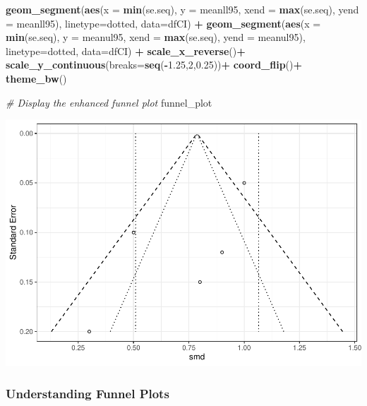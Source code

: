 \documentclass[
]{book}
\newenvironment{Shaded}{\begin{snugshade}}{\end{snugshade}}
\newcommand{\AttributeTok}[1]{\textcolor[rgb]{0.13,0.29,0.53}{#1}}
\newcommand{\CommentTok}[1]{\textcolor[rgb]{0.56,0.35,0.01}{\textit{#1}}}
\newcommand{\DecValTok}[1]{\textcolor[rgb]{0.00,0.00,0.81}{#1}}
\newcommand{\FloatTok}[1]{\textcolor[rgb]{0.00,0.00,0.81}{#1}}
\newcommand{\FunctionTok}[1]{\textcolor[rgb]{0.13,0.29,0.53}{\textbf{#1}}}
\newcommand{\NormalTok}[1]{#1}
\newcommand{\SpecialCharTok}[1]{\textcolor[rgb]{0.81,0.36,0.00}{\textbf{#1}}}
\newcommand{\StringTok}[1]{\textcolor[rgb]{0.31,0.60,0.02}{#1}}
\begin{document}
\begin{Shaded}
\begin{Highlighting}[]
  \FunctionTok{geom\_segment}\NormalTok{(}\FunctionTok{aes}\NormalTok{(}\AttributeTok{x =} \FunctionTok{min}\NormalTok{(se.seq), }\AttributeTok{y =}\NormalTok{ meanll95, }\AttributeTok{xend =} \FunctionTok{max}\NormalTok{(se.seq), }\AttributeTok{yend =}\NormalTok{ meanll95), }\AttributeTok{linetype=}\StringTok{\textquotesingle{}dotted\textquotesingle{}}\NormalTok{, }\AttributeTok{data=}\NormalTok{dfCI) }\SpecialCharTok{+}
  \FunctionTok{geom\_segment}\NormalTok{(}\FunctionTok{aes}\NormalTok{(}\AttributeTok{x =} \FunctionTok{min}\NormalTok{(se.seq), }\AttributeTok{y =}\NormalTok{ meanul95, }\AttributeTok{xend =} \FunctionTok{max}\NormalTok{(se.seq), }\AttributeTok{yend =}\NormalTok{ meanul95), }\AttributeTok{linetype=}\StringTok{\textquotesingle{}dotted\textquotesingle{}}\NormalTok{, }\AttributeTok{data=}\NormalTok{dfCI) }\SpecialCharTok{+}
  \FunctionTok{scale\_x\_reverse}\NormalTok{()}\SpecialCharTok{+}
  \FunctionTok{scale\_y\_continuous}\NormalTok{(}\AttributeTok{breaks=}\FunctionTok{seq}\NormalTok{(}\SpecialCharTok{{-}}\FloatTok{1.25}\NormalTok{,}\DecValTok{2}\NormalTok{,}\FloatTok{0.25}\NormalTok{))}\SpecialCharTok{+}
  \FunctionTok{coord\_flip}\NormalTok{()}\SpecialCharTok{+}
  \FunctionTok{theme\_bw}\NormalTok{()}

\CommentTok{\# Display the enhanced funnel plot}
\NormalTok{funnel\_plot}
\end{Highlighting}
\end{Shaded}

\includegraphics{_main_files/figure-latex/unnamed-chunk-33-1.pdf}

\subsubsection{Understanding Funnel Plots}\label{understanding-funnel-plots}
\end{document}
